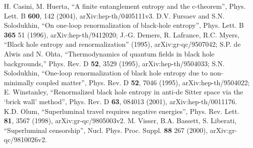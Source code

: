 \documentclass[11pt]{article}
\begin{document}
\begin{thebibliography}{99}
H. Casini, M. Huerta, ``A finite entanglement entropy and the c-theorem'', Phys. Lett. B \textbf{600}, 142 (2004), arXiv:hep-th/0405111v3.
D.V. Fursaev and S.N. Solodukhin, ``On one-loop renormalization of black-hole entropy'', Phys. Lett. B \textbf{365} 51 (1996), arXiv:hep-th/9412020; J.-G. Demers, R. Lafrance, R.C. Myers, ``Black hole entropy and renormalization'' (1995), arXiv:gr-qc/9507042; S.P. de Alwis and N. Ohta, ``Thermodynamics of quantum fields in black hole backgrounds,'' Phys. Rev. D \textbf{52}, 3529 (1995), arXiv:hep-th/9504033; S.N. Solodukhin, ``One-loop renormalization of black hole entropy due to non-minimally coupled matter'', Phys. Rev. D \textbf{52}, 7046 (1995), arXiv:hep-th/9504022;  E. Winstanley, ``Renormalized black hole entropy in anti-de Sitter space via the `brick wall' method'', Phys. Rev. D \textbf{63}, 084013 (2001), arXiv:hep-th/0011176.
K.D. Olum, ``Superluminal travel requires negative energies'', Phys. Rev. Lett. \textbf{81}, 3567 (1998), arXiv:gr-qc/9805003v2.
M. Visser, B.A. Bassett, S. Liberati, ``Superluminal censorship'', Nucl. Phys. Proc. Suppl. \textbf{88} 267 (2000), arXiv:gr-qc/9810026v2.

\end{thebibliography}
\end{document}
